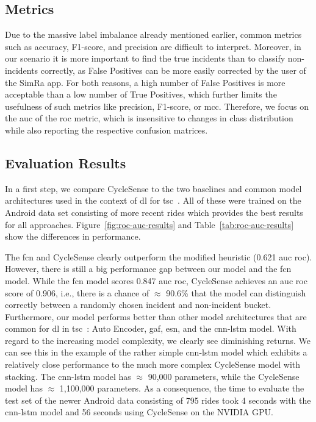 \subsection{Metrics}
\label{subsec:metrics}
Due to the massive label imbalance already mentioned earlier, common metrics such as accuracy, F1-score, and precision are difficult to interpret.
Moreover, in our scenario it is more important to find the true incidents than to classify non-incidents correctly, as False Positives can be more easily corrected by the user of the SimRa app.
For both reasons, a high number of False Positives is more acceptable than a low number of True Positives, which further limits the usefulness of such metrics like precision, F1-score, or \ac{mcc}.
Therefore, we focus on the \ac{auc} of the \ac{roc} metric, which is insensitive to changes in class distribution~\cite{fawcett2006introduction} while also reporting the respective confusion matrices.

\subsection{Evaluation Results}
\label{subsec:evaluation_results}
In a first step, we compare CycleSense to the two baselines and common model architectures used in the context of \ac{dl} for \ac{tsc}~\cite{ismail2019deep}.
All of these were trained on the Android data set consisting of more recent rides which provides the best results for all approaches.
Figure~\ref{fig:roc-auc-results} and Table~\ref{tab:roc-auc-results} show the differences in performance.

The \ac{fcn} and CycleSense clearly outperform the modified heuristic (0.621 \ac{auc} \ac{roc}).
However, there is still a big performance gap between our model and the \ac{fcn} model.
While the \ac{fcn} model scores 0.847 \ac{auc} \ac{roc}, CycleSense achieves an \ac{auc} \ac{roc} score of 0.906, i.e., there is a chance of $\approx$ 90.6\% that the model can distinguish correctly between a randomly chosen incident and non-incident bucket.
Furthermore, our model performs better than other model architectures that are common for \ac{dl} in \ac{tsc}~\cite{ismail2019deep}: Auto Encoder, \ac{gaf}, \ac{esn}, and the \ac{cnn}-\ac{lstm} model.
With regard to the increasing model complexity, we clearly see diminishing returns.
We can see this in the example of the rather simple \ac{cnn}-\ac{lstm} model which exhibits a relatively close performance to the much more complex CycleSense model with stacking.
The \ac{cnn}-\ac{lstm} model has $\approx$ 90,000 parameters, while the CycleSense model has $\approx$ 1,100,000 parameters.
As a consequence, the time to evaluate the test set of the newer Android data consisting of 795 rides took 4 seconds with the \ac{cnn}-\ac{lstm} model and 56 seconds using CycleSense on the NVIDIA GPU.

